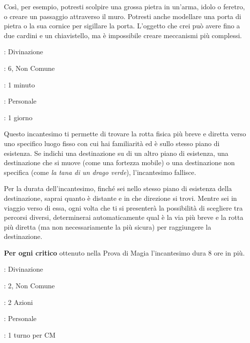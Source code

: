 \begin{multicols}{2}
Così, per esempio, potresti scolpire una grossa pietra in un'arma, idolo o feretro, o creare un passaggio attraverso il muro. Potresti anche modellare una porta di pietra o la sua cornice per sigillare la porta. L'oggetto che crei può avere fino a due cardini e un chiavistello, ma è impossibile creare meccanismi più complessi.

\noindent\colorbox{OBSSgold!10}{
\begin{minipage}{0.95\linewidth}
\begin{description}[noitemsep, topsep=0pt, parsep=0pt, partopsep=0pt, leftmargin=0cm, labelwidth=1.3cm]
	\item[\textbf{Lista}]: Divinazione
	\item[\textbf{Livello}]: 6, Non Comune
	\item[\textbf{Lancio}]: 1 minuto
	\item[\textbf{Gittata}]: Personale
	\item[\textbf{Durata}]: 1 giorno
\end{description}
\end{minipage}}\smallskip

Questo incantesimo ti permette di trovare la rotta fisica più breve e diretta verso uno specifico luogo fisso con cui hai familiarità ed è sullo stesso piano di esistenza. Se indichi una destinazione su di un altro piano di esistenza, una destinazione che si muove (come una fortezza mobile) o una destinazione non specifica (come \emph{la tana di un drago verde}), l'incantesimo fallisce.

Per la durata dell'incantesimo, finché sei nello stesso piano di esistenza della destinazione, saprai quanto è distante e in che direzione si trovi. Mentre sei in viaggio verso di essa, ogni volta che ti si presenterà la possibilità di scegliere tra percorsi diversi, determinerai automaticamente qual è la via più breve e la rotta più diretta (ma non necessariamente la più sicura) per raggiungere la destinazione.

\textbf{Per ogni critico} ottenuto nella Prova di Magia l'incantesimo dura 8 ore in più.

\noindent\colorbox{OBSSgold!10}{
\begin{minipage}{0.95\linewidth}
\begin{description}[noitemsep, topsep=0pt, parsep=0pt, partopsep=0pt, leftmargin=0cm, labelwidth=1.3cm]
	\item[\textbf{Lista}]: Divinazione
	\item[\textbf{Livello}]: 2, Non Comune
	\item[\textbf{Lancio}]: 2 Azioni
	\item[\textbf{Gittata}]: Personale
	\item[\textbf{Durata}]: 1 turno per CM
\end{description}
\end{minipage}}\smallskip


\end{multicols}

